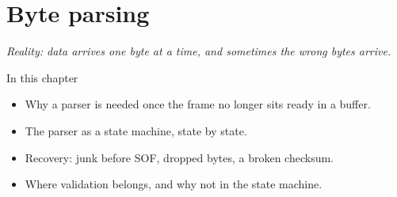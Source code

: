 \chapter{Byte parsing}
\label{ch:parsning}


{\large\itshape Reality: data arrives one byte at a time, and sometimes the wrong bytes
arrive.\par}

\begin{chapterbox}{In this chapter}
\begin{itemize}
  \item Why a parser is needed once the frame no longer sits ready in a buffer.
  \item The parser as a state machine, state by state.
  \item Recovery: junk before SOF, dropped bytes, a broken checksum.
  \item Where validation belongs, and why not in the state machine.
\end{itemize}
\end{chapterbox}





